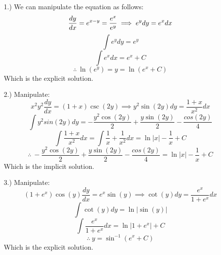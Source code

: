\documentclass[12pt]{article}
\begin{document}
\pagestyle{fancy}
\fancyhead{}

\normalsize
\begin{itemize}
    \item [1.)] We can manipulate the equation as follows:
    \begin{equation*}
        \dfrac{dy}{dx}=e^{x-y}=\frac{e^x}{e^y}\implies e^ydy=e^xdx\\
    \end{equation*}
    \begin{equation*}
        \int e^ydy=e^y
    \end{equation*}
    \begin{equation*}
        \int e^xdx=e^x+C
    \end{equation*}
    \begin{equation*}
        \therefore\ \ln(e^y)=y=\ln(e^x+C)
    \end{equation*}
    Which is the explicit solution.

    \item [2.)] Manipulate:
    \begin{equation*}
        x^2y^2\dfrac{dy}{dx}=(1+x)\csc(2y)\implies y^2\sin(2y)dy=\frac{1+x}{x^2}dx
    \end{equation*}
    \begin{equation*}
        \int y^2sin(2y)dy=-\frac{y^2\cos(2y)}{2}+\frac{y\sin(2y)}{2}-\frac{cos(2y)}{4}
    \end{equation*}
    \begin{equation*}
        \int \frac{1+x}{x^2}dx=\int \frac{1}{x}+\frac{1}{x^2}dx=\ln\vert x\vert-\frac{1}{x}+C
    \end{equation*}
    \begin{equation*}
        \therefore\ -\frac{y^2\cos(2y)}{2}+\frac{y\sin(2y)}{2}-\frac{cos(2y)}{4}=\ln\vert x\vert-\frac{1}{x}+C
    \end{equation*}
    Which is the implicit solution.

    \item [3.)] Manipulate:
    \begin{equation*}
        (1+e^x)\cos(y)\dfrac{dy}{dx}=e^x\sin(y)\implies\cot(y)dy=\frac{e^x}{1+e^x}dx
    \end{equation*}
    \begin{equation*}
        \int \cot(y)dy=\ln\vert\sin(y)\vert
    \end{equation*}
    \begin{equation*}
        \int\frac{e^x}{1+e^x}dx=\ln\vert 1+e^x\vert+C
    \end{equation*}
    \begin{equation*}
        \therefore\ y=\sin^{-1}(e^x+C)
    \end{equation*}
    Which is the explicit solution.


\end{itemize}
\end{document}
